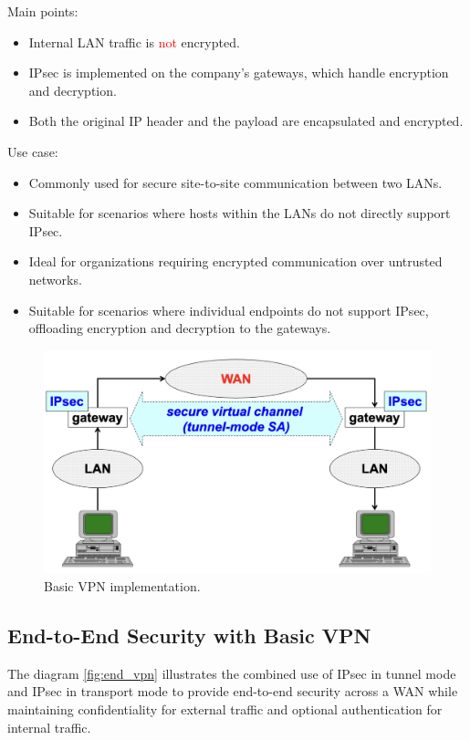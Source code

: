Main points:
\begin{itemize}
    \item Internal LAN traffic is \textcolor{red}{not} encrypted.
    \item IPsec is implemented on the company's gateways, which handle encryption and decryption.
    \item Both the original IP header and the payload are encapsulated and encrypted.
\end{itemize}

Use case:
\begin{itemize}
    \item Commonly used for secure site-to-site communication between two LANs.
    \item Suitable for scenarios where hosts within the LANs do not directly support IPsec.
    \item Ideal for organizations requiring encrypted communication over untrusted networks.
    \item Suitable for scenarios where individual endpoints do not support IPsec, offloading encryption and decryption to the gateways.
\end{itemize}

\begin{figure}[H]
  \includegraphics[width=\linewidth]{Images/NetSec/basic_vpn.png}
  \caption{Basic VPN implementation.}
  \label{fig:basicVPN}
\end{figure}

\subsection{End-to-End Security with Basic VPN}
The diagram \ref{fig:end_vpn} illustrates the combined use of IPsec in tunnel mode and IPsec in transport mode to provide end-to-end security across a WAN while maintaining confidentiality for external traffic and optional authentication for internal traffic.

